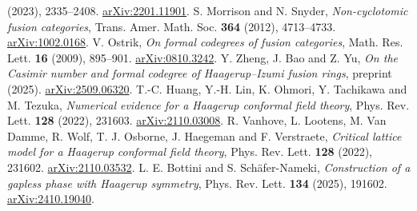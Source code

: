(2023), 2335--2408.
\href{https://arxiv.org/abs/2201.11901}{arXiv:2201.11901}.
S. Morrison and N. Snyder, \emph{Non-cyclotomic fusion categories},
Trans. Amer. Math. Soc. \textbf{364} (2012), 4713--4733.
\href{https://arxiv.org/abs/1002.0168}{arXiv:1002.0168}.
V. Ostrik, \emph{On formal codegrees of fusion categories}, Math. Res.
Lett. \textbf{16} (2009), 895--901.
\href{https://arxiv.org/abs/0810.3242}{arXiv:0810.3242}.
Y. Zheng, J. Bao and Z. Yu, \emph{On the Casimir number and formal
codegree of Haagerup--Izumi fusion rings}, preprint (2025).
\href{https://arxiv.org/abs/2509.06320}{arXiv:2509.06320}.
T.-C. Huang, Y.-H. Lin, K. Ohmori, Y. Tachikawa and M. Tezuka,
\emph{Numerical evidence for a Haagerup conformal field theory}, Phys.
Rev. Lett. \textbf{128} (2022), 231603.
\href{https://arxiv.org/abs/2110.03008}{arXiv:2110.03008}.
R. Vanhove, L. Lootens, M. Van Damme, R. Wolf, T. J. Osborne,
J. Haegeman and F. Verstraete, \emph{Critical lattice model for a
Haagerup conformal field theory}, Phys. Rev. Lett. \textbf{128} (2022),
231602. \href{https://arxiv.org/abs/2110.03532}{arXiv:2110.03532}.
L. E. Bottini and S. Sch\"afer-Nameki, \emph{Construction of a gapless
phase with Haagerup symmetry}, Phys. Rev. Lett. \textbf{134} (2025),
191602. \href{https://arxiv.org/abs/2410.19040}{arXiv:2410.19040}.
